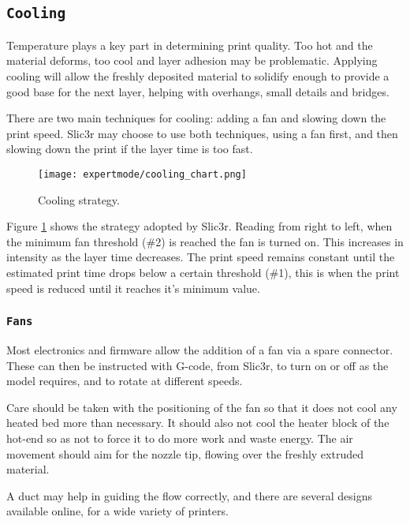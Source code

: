 
\subsection{\texttt{Cooling}} %
\label{sec:cooling}

Temperature plays a key part in determining print quality.  Too hot and the material deforms, too cool and layer adhesion may be problematic.  Applying cooling will allow the freshly deposited material to solidify enough to provide a good base for the next layer, helping with overhangs, small details and bridges.

There are two main techniques for cooling: adding a fan and slowing down the print speed.  Slic3r may choose to use both techniques, using a fan first, and then slowing down the print if the layer time is too fast.

\begin{figure}[H]
\centering
\texttt{[image: expertmode/cooling\_chart.png]}
\caption{Cooling strategy.}
\label{fig:cooling_chart}
\end{figure}

Figure \ref{fig:cooling_chart} shows the strategy adopted by Slic3r.  Reading from right to left, when the minimum fan threshold (\#2) is reached the fan is turned on.  This increases in intensity as the layer time decreases.  The print speed remains constant until the estimated print time drops below a certain threshold (\#1), this is when the print speed is reduced until it reaches it's minimum value.

\subsubsection{\texttt{Fans}} %
\label{sub:fans}
Most electronics and firmware allow the addition of a fan via a spare connector.  These can then be instructed with G-code, from Slic3r, to turn on or off as the model requires, and to rotate at different speeds.

Care should be taken with the positioning of the fan so that it does not cool any heated bed more than necessary.  It should also not cool the heater block of the hot-end so as not to force it to do more work and waste energy.  The air movement should aim for the nozzle tip, flowing over the freshly extruded material.

A duct may help in guiding the flow correctly, and there are several designs available online, for a wide variety of printers.

